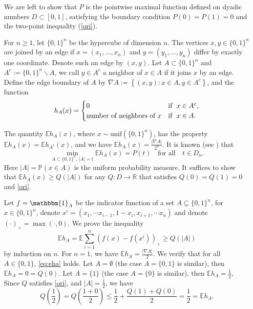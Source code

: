 \documentclass[11pt]{amsart}
\theoremstyle{definition}
\newcommand{\E}{\mathbb{E}}
\renewcommand{\1}{{\mathbbm{1}}}
\begin{document}
\vskip0.5cm

We are left to show that $P$ is the pointwise maximal function defined on dyadic numbers $D \subset [0,1]$, satisfying the boundary condition $P(0)=P(1)=0$ and the two-point inequality (\ref{ori}).

\vskip0.5cm

For $n \geq 1$, let $\{0,1\}^n$ be the hypercube of dimension $n$. The vertices $x, y \in\{0,1\}^n$ are joined by an edge if $x=\left(x_1, \ldots, x_n\right)$ and $y=\left(y_1, \ldots, y_n\right)$ differ by exactly one coordinate. Denote such an edge by $(x, y)$. 
Let $A\subset \{0,1\}^n$ and $A^c:=\{0,1\}^n \backslash A$, we call $y\in A^c$ a neighbor of $x\in A$ if it joins $x$ by an edge.
Define the edge boundary of $A$ by $\nabla A:=\left\{(x, y): x \in A, y \in A^c\right\}$, and the function 
\[
h_A (x) =\begin{cases}
    0&{\rm{if}}\;\; x \in A^c,\\
    \text{number of neighbors of $x$} & {\rm{if}}\;\; x\in A.
\end{cases}
\]

The quantity $\mathbb{E} h_A(x)$, where $x\sim \mathrm{unif}(\{0,1\}^{n})$,  has the property $\mathbb{E} h_A(x)=\mathbb{E} h_{A^c}(x)$, and we have $\mathbb{E} h_A(x)=\frac{|\nabla A|}{2^n}$.
It is known (see \cite{BIM}) that
\[
\min_{A\subset \{0,1\}^n,\, |A|=t} \mathbb{E} h_A(x)=P(t)
\quad \text{for all} \quad t \in D_{n}.
\]
Here $|A| = \mathbb{P}(x \in A)$ is the uniform probability measure. 
It suffices to show that 
$\E h_A(x) \geq Q(|A|)$
for any  $Q:{D}\to \mathbb{R}$ that satisfies $Q(0)=Q(1)=0$ and \eqref{ori}.

Let $f = \1_A$ be the indicator function of a set $A\subseteq \{0,1\}^n$, for $x\in \{0,1\}^n$, denote $x^i= (x_1,\cdots x_{i-1},1-x_i,x_{i+1},\cdots x_n)$ and denote $(\cdot)_{+} = \max(\cdot,0)$.
We prove the inequality 
\begin{equation}\label{eq:eha}
\E h_A 
= \E \sum_{i=1}^{n} (f(x)-f(x^i))_{+}
\geq Q(|A|)
\end{equation}
 by induction on $n$.  
For $n=1$, we have $\E h_A = \frac{|\nabla A|}{2}$. We verify that for all $A\in \{0,1\}$, \eqref{eq:eha} holds. %
Let $A = \emptyset$ (the case $A=\{0,1\}$ is similar), then $\E h_A = 0 = Q(0)$.
Let $A= \{1\}$  (the case $A=\{0\}$ is similar), then $\E h_A = \frac{1}{2}$, 
Since $Q$ satisfies \eqref{ori}, and $|A| = \frac{1}{2}$, we have 
\[
Q\left(\frac{1}{2}\right) = Q\left( \frac{1+0}{2} \right) \leq \frac{1}{2} + \frac{Q(1)+Q(0)}{2} = \frac{1}{2}= \E h_A.
\]
\end{document}
